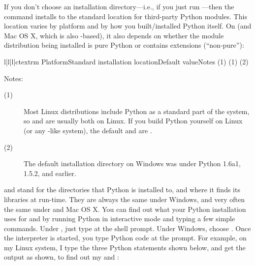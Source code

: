 \documentclass{howto}
\begin{document}
If you don't choose an installation directory---i.e., if you just run
---then the  command installs to
the standard location for third-party Python modules.  This location
varies by platform and by how you built/installed Python itself.  On
\UNIX{} (and Mac OS X, which is also \UNIX-based),
it also depends on whether the module distribution
being installed is pure Python or contains extensions (``non-pure''):
\begin{tableiv}{l|l|l|c}{textrm}%
  {Platform}{Standard installation location}{Default value}{Notes}
          {}
          {}
          {(1)}
          {}
          {}
          {(1)}
          {}
          {}
          {(2)}
\end{tableiv}

\noindent Notes:
\begin{description}
\item[(1)] Most Linux distributions include Python as a standard part of
  the system, so  and  are usually
  both  on Linux.  If you build Python yourself on Linux (or
  any \UNIX-like system), the default  and
   are .
\item[(2)] The default installation directory on Windows was
   under
  Python 1.6a1, 1.5.2, and earlier.
\end{description}

 and  stand for the directories
that Python is installed to, and where it finds its libraries at
run-time.  They are always the same under Windows, and very
often the same under \UNIX{} and Mac OS X.  You can find out what your Python
installation uses for  and  by
running Python in interactive mode and typing a few simple commands.
Under \UNIX, just type  at the shell prompt.  Under
Windows, choose .  
Once the interpreter is started, you type Python code at the
prompt.  For example, on my Linux system, I type the three Python
statements shown below, and get the output as shown, to find out my
 and :
\end{document}
